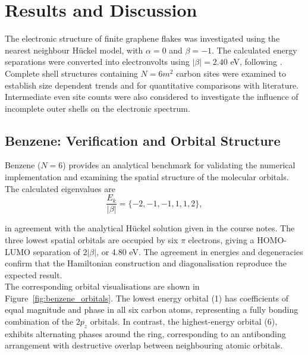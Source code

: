 \chapter{Results and Discussion}\label{ch:Results}


\noindent The electronic structure of finite graphene flakes was investigated using the nearest neighbour H\"uckel model, with $\alpha=0$ and $\beta=-1$. The calculated energy separations were converted into electronvolts using $|\beta|=2.40$ eV, following \textcite{jeongCalculationElectronicStructures2024}. Complete shell structures containing $N=6m^2$ carbon sites were examined to establish size dependent trends and for quantitative comparisons with literature.  Intermediate even site counts were also considered to investigate the influence of incomplete outer shells on the electronic spectrum.


\section{Benzene: Verification and Orbital Structure}
\label{sec:benzene_results}

Benzene ($N=6$) provides an analytical benchmark for validating the numerical implementation and examining the spatial structure of the molecular orbitals. The calculated eigenvalues are \\

\begin{equation}
    \frac{E_k}{|\beta|}
    =
    \{-2,-1,-1,1,1,2\},
\end{equation}

\noindent in agreement with the analytical H\"uckel solution given in the course notes. The three lowest spatial orbitals are occupied by six $\pi$ electrons, giving a HOMO-LUMO separation of $2|\beta|$, or 4.80 eV. The agreement in energies and degeneracies confirm that the Hamiltonian construction and diagonalisation reproduce the expected result. \\

\noindent The corresponding orbital visualisations are shown in Figure~\ref{fig:benzene_orbitals}. The lowest energy orbital (1) has coefficients of equal magnitude and phase in all six carbon atoms, representing a fully bonding combination of the $2p_z$ orbitals.  In contrast, the highest-energy orbital (6), exhibits alternating phases around the ring, corresponding to an antibonding arrangement with destructive overlap between neighbouring atomic orbitals. \\

